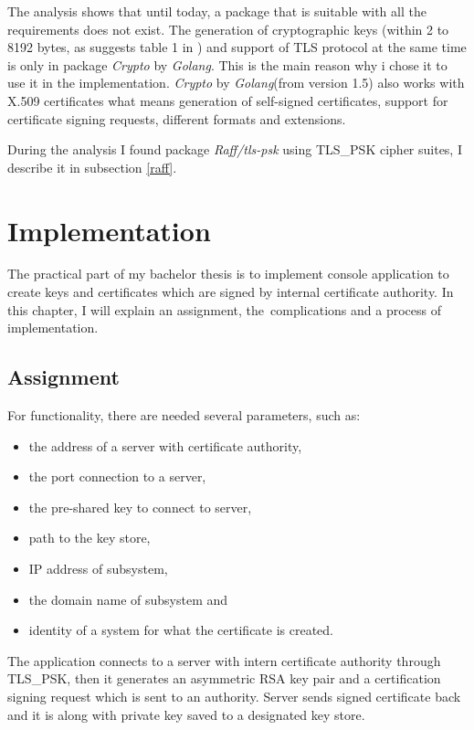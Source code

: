 \documentclass[
  oneside, 12pt, 
  printed, %
  notable,   %
  nolof,     %
  nolot,     %
]{fithesis3}
\begin{document}
The analysis shows that until today, a package that is suitable with all the requirements does not 
exist. The generation of cryptographic keys (within 2 to 8192 bytes, as suggests 
table 1 in \cite{hinek2008security}) and support of TLS protocol at the same time is only in 
package \textit{Crypto} by \textit{Golang}. This is the main reason why i chose it to use it in 
the implementation. \textit{Crypto} by \textit{Golang}(from version 1.5) also works with X.509 certificates what means generation of self-signed certificates, support for certificate signing requests, different formats and extensions. %

During the analysis I found package \textit{Raff/tls-psk} using TLS\_PSK cipher suites, I describe 
it in subsection \ref{raff}.

\chapter{Implementation}

The practical part of my bachelor thesis is to implement console application to create keys and 
certificates which are signed by internal certificate authority. In this chapter, I will explain 
an assignment, the~complications and a process of implementation. 

\section{Assignment}
For functionality, there are needed several parameters, such as:
\begin{itemize}[leftmargin=2em,rightmargin=1em,itemsep=0.75\parskip,parsep=0em,topsep=0em,partopsep=0em]
\item the address of a server with certificate authority,
\item the port connection to a server,
\item the pre-shared key to connect to server,
\item path to the key store,
\item IP address of subsystem,
\item the domain name of subsystem and 
\item identity of a system for what the certificate is created.
\end{itemize}
\vskip 0.1in
The application connects to a server with intern certificate authority through TLS\_PSK, then it 
generates an asymmetric RSA key pair and a certification signing request which is sent to an 
authority. Server sends signed certificate back and it is along with private key saved to a 
designated key store.
\end{document}
